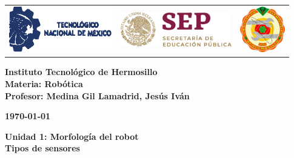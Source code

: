 \begin{titlepage}
	\centering
	\begin{tabular}{@{}p{} p{} p{}@{}}
		\includegraphics[height=2cm]{tecnm} & 
		\centering \includegraphics[height=1.5cm]{SEP} & 
		\raggedleft \includegraphics[height=2cm]{ith.jpg} \\
	\end{tabular}
	
	\vspace{2em}
	
	\noindent
	\begin{minipage}[t]{0.48\textwidth}
		\raggedright
		\small \textbf{%
			Instituto Tecnológico de Hermosillo\\
			Materia: Robótica\\
			Profesor: Medina Gil Lamadrid, Jesús Iván%
		}
	\end{minipage}%
	\hfill
	\begin{minipage}[t]{0.48\textwidth}
		\raggedleft
		\small \textbf{\today}
	\end{minipage}
	
	\vspace{2em}
	
	{\large \textbf{Unidad 1: Morfología del robot}}\\
	{\Huge \textbf{Tipos de sensores}}
		
	\vspace{1em}
	

\end{titlepage}
